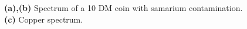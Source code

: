 \documentclass[a4paper]{scrartcl}
\numberwithin{equation}{section}
\numberwithin{figure}{section}
\numberwithin{table}{section}
\begin{document}
\begin{figure}
 \caption{\small \textbf{(a),(b) }Spectrum of a 10 DM coin with samarium contamination. \textbf{(c)} Copper spectrum. }
        \label{fig:DM}
\end{figure}





\FloatBarrier
\clearpage
 

\end{document}
